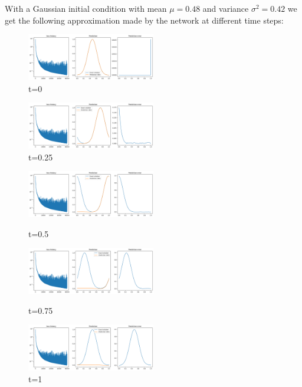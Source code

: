 \documentclass{article}
\begin{document}
With a Gaussian initial condition with mean $\mu = 0.48$ and variance $\sigma^2 = 0.42$ we get the following approximation made by the network at different time steps:\\
\begin{figure}[!h]
    \centering
    \includegraphics[width=0.5\textwidth]{images/nsup1.png}
    \caption{t=0}
\end{figure}
\newpage
\begin{figure}[!h]
    \centering
    \includegraphics[width=0.5\textwidth]{images/nsup2.png}
    \caption{t=0.25}
\end{figure}

\begin{figure}[!h]
    \centering
    \includegraphics[width=0.5\textwidth]{images/nsup3.png}
    \caption{t=0.5}
    \includegraphics[width=0.5\textwidth]{images/nsup4.png}
    \caption{t=0.75}
    \includegraphics[width=0.5\textwidth]{images/nsup5.png}
    \caption{t=1}
\end{figure} 
\end{document}
